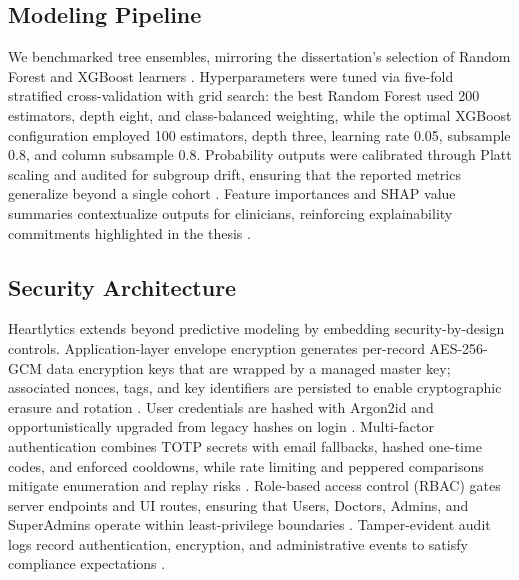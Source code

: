 \documentclass[conference]{IEEEtran}
\begin{document}
\subsection{Modeling Pipeline}
We benchmarked tree ensembles, mirroring the dissertation's selection of Random Forest and XGBoost learners \cite{breiman2001random, chen2016xgboost}. Hyperparameters were tuned via five-fold stratified cross-validation with grid search: the best Random Forest used 200 estimators, depth eight, and class-balanced weighting, while the optimal XGBoost configuration employed 100 estimators, depth three, learning rate 0.05, subsample 0.8, and column subsample 0.8. Probability outputs were calibrated through Platt scaling and audited for subgroup drift, ensuring that the reported metrics generalize beyond a single cohort \cite{platt1999probabilistic, kohavi1995study}. Feature importances and SHAP value summaries contextualize outputs for clinicians, reinforcing explainability commitments highlighted in the thesis \cite{lundberg2017unified}.

\subsection{Security Architecture}
Heartlytics extends beyond predictive modeling by embedding security-by-design controls. Application-layer envelope encryption generates per-record AES-256-GCM data encryption keys that are wrapped by a managed master key; associated nonces, tags, and key identifiers are persisted to enable cryptographic erasure and rotation \cite{dworkin2007recommendation, googlekms, awskms}. User credentials are hashed with Argon2id and opportunistically upgraded from legacy hashes on login \cite{biryukov2015argon2, provos1999bcrypt}. Multi-factor authentication combines TOTP secrets with email fallbacks, hashed one-time codes, and enforced cooldowns, while rate limiting and peppered comparisons mitigate enumeration and replay risks \cite{grassi2017digital, mraihi2011totp, owasp2021}. Role-based access control (RBAC) gates server endpoints and UI routes, ensuring that Users, Doctors, Admins, and SuperAdmins operate within least-privilege boundaries \cite{ferraiolo2001proposed}. Tamper-evident audit logs record authentication, encryption, and administrative events to satisfy compliance expectations \cite{howard2006security, shostack2014threat}.
\end{document}
